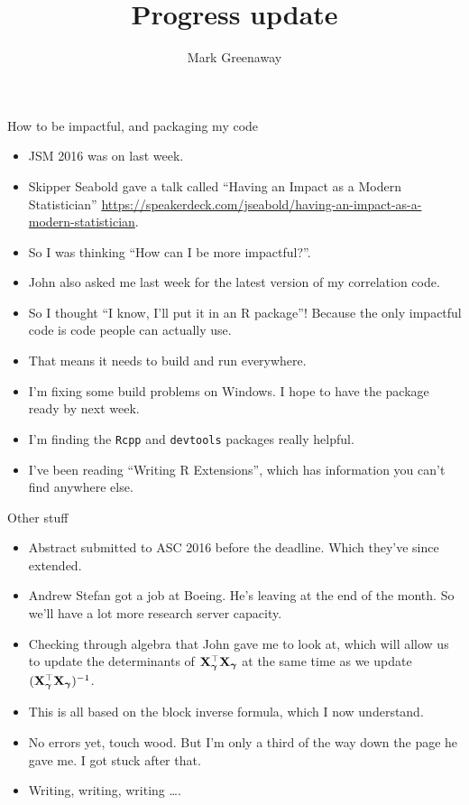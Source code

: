 \documentclass{beamer}
\title{Progress update}
\author{Mark Greenaway}
\begin{document}
\begin{frame}
\titlepage
\end{frame}

\begin{frame}{How to be impactful, and packaging my code}
\begin{itemize}
\item JSM 2016 was on last week.
\item Skipper Seabold gave a talk called ``Having an Impact as a Modern Statistician'' \url{https://speakerdeck.com/jseabold/having-an-impact-as-a-modern-statistician}.
\item So I was thinking ``How can I be more impactful?''.
\item John also asked me last week for the latest version of my correlation code.
\item So I thought ``I know, I'll put it in an R package''! Because the only impactful code is code people can
actually use.
\item That means it needs to build and run everywhere.
\item I'm fixing some build problems on Windows. I hope to have the package ready by next week.
\item I'm finding the \texttt{Rcpp} and \texttt{devtools} packages really helpful.
\item I've been reading ``Writing R Extensions'', which has information you can't find anywhere else.
\end{itemize}
\end{frame}

\begin{frame}{Other stuff}
\begin{itemize}
\item Abstract submitted to ASC 2016 before the deadline. Which they've since extended.
\item Andrew Stefan got a job at Boeing. He's leaving at the end of the month. So we'll have a lot more
research server capacity.
\item Checking through algebra that John gave me to look at, which will allow us to update the determinants
of ${\bf X}_{\boldsymbol \gamma}^\top {\bf X}_{\boldsymbol \gamma}$ at the same time as we update $({\bf X}_{\boldsymbol \gamma}^\top {\bf X}_{\boldsymbol \gamma})^{-1}$.
\item This is all based on the block inverse formula, which I now understand.
\item No errors yet, touch wood. But I'm only a third of the way down the page he gave me. I got stuck after
that.
\item Writing, writing, writing \ldots.
\end{itemize}
\end{frame}
\end{document}
